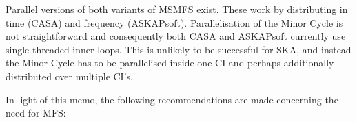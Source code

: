 \documentclass[11pt,a4paper,variablewidth]{article}
\begin{document}

\newcommand{\Wim}{{{\W^{\rm im}}}}
\newcommand{\Wimd}{{{{\W^{\rm im}}^\dag}}}
\newcommand{\Wnt}{{{\W^{\rm {mfs}}_t}}}
\newcommand{\Wntd}{{{{\W^{\rm {mfs}}_t}^\dag}}}
\newcommand{\Wnp}{{{\W^{\rm mfs}_p}}}
\newcommand{\Wnpd}{{{{\W^{\rm mfs}_p}^\dag}}}
\newcommand{\Wnq}{{{\W^{\rm mfs}_q}}}
\newcommand{\Wnqd}{{{{\W^{\rm {mfs}}_q}^\dag}}}
\newcommand{\Wimn}{{{\W^{\rm im}_{\nu}}}}
\newcommand{\Wimnd}{{{{\W^{\rm im}_{\nu}}^\dag}}}

\newcommand{\wnt}{{w_{\nu}^t}}
\newcommand{\wnq}{{w_{\nu}^q}}
\newcommand{\wntq}{{w_{\nu}^{t+q}}}

\newcommand{\pd}{{\partial}}
\newcommand{\mi}{{m_{I}}}
\newcommand{\R}{{R}}
\newcommand{\Rd}{{R^\dag}}
\newcommand{\I}{{\vec{I}}}

\newcommand{\Nt}{N_{\rm t}}
\newcommand{\Ns}{N_{\rm s}}
\newcommand{\Nc}{N_{\rm c}}


\sdplistoffigures

\sdplistoftables

\sdpsummary

Parallel versions of both variants of MSMFS exist. These work by distributing in time (CASA) and frequency (ASKAPsoft). Parallelisation of the Minor Cycle is not straightforward and consequently both CASA and ASKAPsoft currently use single-threaded inner loops. This is unlikely to be successful for SKA, and instead the Minor Cycle has to be parallelised inside one CI and perhaps additionally distributed over multiple CI's.

In light of this memo, the following recommendations are made concerning the need for MFS:
\end{document}
